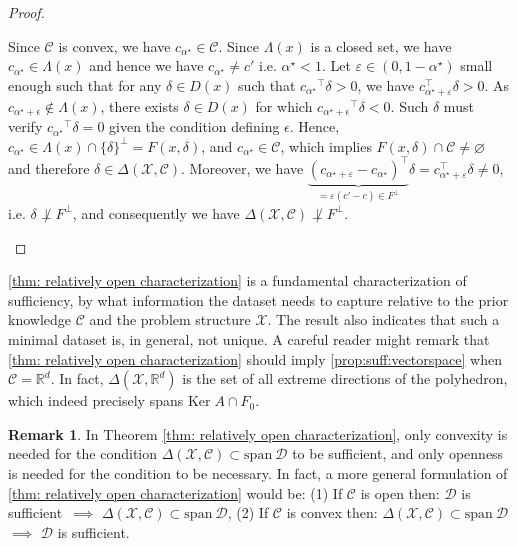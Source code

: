 \documentclass[11pt]{article}
\theoremstyle{plain}
\theoremstyle{definition}
\newtheorem{remark}{Remark}
\newcommand{\Ker}[0]{\mathrm{Ker}\;}
\newcommand{\Vect}{\mathrm{span}~}
\newcommand{\suff}{sufficient}
\newcommand{\cX}{\mathcal{X}}
\newcommand{\cC}{\mathcal{C}}
\newcommand{\cD}{\mathcal{D}}
\renewcommand{\Re}{\mathbb{R}}
\begin{document}
\begin{proof}
\begin{itemize}
        Since $\cC$ is convex, we have $c_{\alpha^\star} \in \cC$.  Since $\Lambda(x)$ is a closed set, we have $c_{\alpha^\star} \in \Lambda(x)$ and hence we have $c_{\alpha^\star} \neq c'$ i.e. $\alpha^\star<1$. Let $\varepsilon\in(0,1-\alpha^\star)$ small enough such that for any $\delta \in D(x)$ such that ${c_{\alpha^\star}}^\top \delta>0$, we have $c_{\alpha^\star+\varepsilon}^\top \delta >0$. As $c_{\alpha^\star + \epsilon} \not \in \Lambda(x)$, there exists $\delta \in D(x)$ for which ${c_{\alpha^\star + \epsilon}}^\top \delta<0$. Such $\delta$ must verify ${c_{\alpha^\star}}^\top \delta = 0$ given the condition defining $\epsilon$. Hence, $c_{\alpha^\star} \in \Lambda(x) \cap \{\delta\}^\perp = F(x,\delta)$, and $c_{\alpha^\star} \in \cC$, which implies $F(x,\delta) \cap \cC \neq \varnothing$ and therefore $\delta \in \Delta(\cX,\cC)$. Moreover, we have $\underbrace{(c_{\alpha^\star+\varepsilon}-c_{\alpha^\star})^\top}_{=\varepsilon(c'-c)\in  F^\perp} \delta =  c_{\alpha^\star+\varepsilon}^\top \delta \neq 0$, i.e. $\delta \not \perp  F^\perp$, and consequently we have $\Delta(\cX,\cC) \not\perp F^\perp$.
        \end{itemize}
        \end{proof}

        \cref{thm: relatively open characterization} is a fundamental characterization of sufficiency, by what information the dataset needs to capture relative to the prior knowledge $\cC$ and the problem structure $\cX$. The result also indicates that such a minimal dataset is, in general, not unique. A careful reader might remark that \cref{thm: relatively open characterization} should imply \cref{prop:suff:vectorspace} when $\cC = \Re^d$. In fact, $\Delta(\cX,\Re^d)$ is the set of all extreme directions of the polyhedron, which indeed precisely spans $\Ker A \cap F_0$.
        
         \begin{remark}
         In Theorem \ref{thm: relatively open characterization}, only convexity is needed for the condition $ \Delta(\cX,\cC) \subset\Vect \mathcal D$ to be sufficient, and only openness is needed for the condition to be necessary. In fact, a more general formulation of \cref{thm: relatively open characterization} would be: (1) If $\cC$ is open then: $\cD$ is \suff\ $\implies$ $\Delta(\cX,\cC) \subset  \Vect \mathcal D$, (2) If $\cC$ is convex then: $\Delta(\cX,\cC) \subset  \Vect \mathcal D$ $\implies$ $\cD$ is \suff.
         \end{remark}
\end{document}
